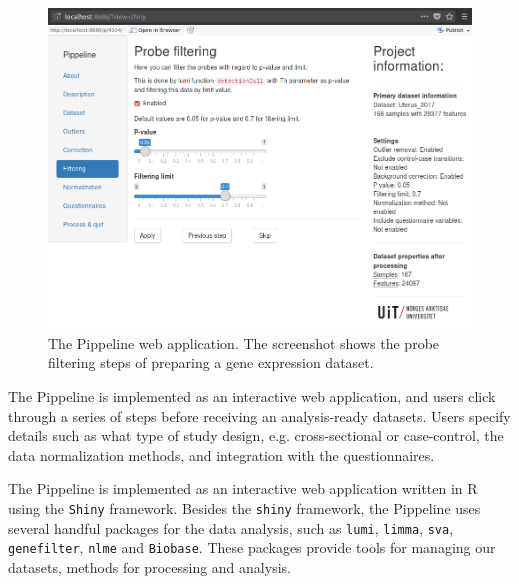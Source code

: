 \begin{figure}
  \includegraphics[width=\linewidth]{figures/scr_filtering.png}
  \caption{The Pippeline web application. The screenshot shows the probe
  filtering steps of preparing a gene expression dataset.}
  \label{fig:scr_filtering}
\end{figure}

The Pippeline is implemented as an interactive web application, and users click
through a series of steps before receiving an analysis-ready datasets. 
Users specify details such as what type of study design, e.g. cross-sectional or
case-control, the data normalization methods, and integration with the
questionnaires. 

The Pippeline is implemented as an interactive web application written in R
using the \texttt{Shiny} framework.  Besides the \texttt{shiny} framework, the
Pippeline uses several handful packages for the data analysis, such as
\texttt{lumi}, \texttt{limma}, \texttt{sva}, \texttt{genefilter}, \texttt{nlme}
and \texttt{Biobase}. These packages provide tools for managing our datasets,
methods for processing and analysis. 



